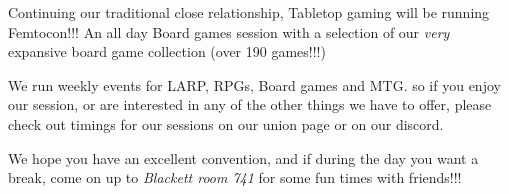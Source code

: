Continuing our traditional close relationship, Tabletop gaming will be running Femtocon!!! An all day Board games session with a selection of our \emph{very} expansive board game collection (over 190 games!!!)

We run weekly events for LARP, RPGs, Board games and MTG. so if you enjoy our session, or are interested in any of the other things we have to offer, please check out timings for our sessions on our union page or on our discord.

We hope you have an excellent convention, and if during the day you want a break, come on up to \emph{Blackett room 741} for some fun times with friends!!!